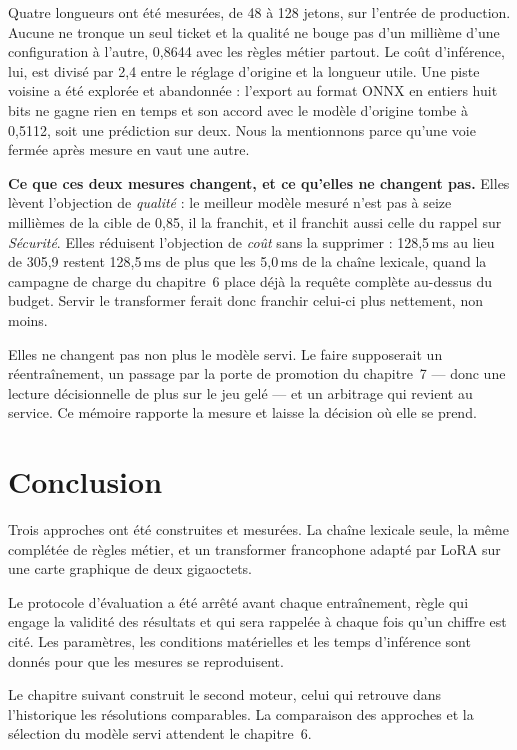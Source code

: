 Quatre longueurs ont été mesurées, de 48 à 128 jetons, sur l'entrée de production. Aucune ne
tronque un seul ticket et la qualité ne bouge pas d'un millième d'une configuration à l'autre,
0,8644 avec les règles métier partout. Le coût d'inférence, lui, est divisé par 2,4 entre le
réglage d'origine et la longueur utile. Une piste voisine a été explorée et abandonnée : l'export
au format ONNX en entiers huit bits ne gagne rien en temps et son accord avec le modèle d'origine
tombe à 0,5112, soit une prédiction sur deux. Nous la mentionnons parce qu'une voie fermée après
mesure en vaut une autre.

\textbf{Ce que ces deux mesures changent, et ce qu'elles ne changent pas.} Elles lèvent l'objection
de \emph{qualité} : le meilleur modèle mesuré n'est pas à seize millièmes de la cible de 0,85, il la
franchit, et il franchit aussi celle du rappel sur \emph{Sécurité}. Elles réduisent l'objection de
\emph{coût} sans la supprimer : 128,5\,ms au lieu de 305,9 restent 128,5\,ms de plus que les
5,0\,ms de la chaîne lexicale, quand la campagne de charge du chapitre~6 place déjà la requête
complète au-dessus du budget. Servir le transformer ferait donc franchir celui-ci plus nettement,
non moins.

Elles ne changent pas non plus le modèle servi. Le faire supposerait un réentraînement, un passage
par la porte de promotion du chapitre~7 — donc une lecture décisionnelle de plus sur le jeu gelé —
et un arbitrage qui revient au service. Ce mémoire rapporte la mesure et laisse la décision où elle
se prend.


\FloatBarrier

\section*{Conclusion}

Trois approches ont été construites et mesurées. La chaîne lexicale seule, la même complétée de
règles métier, et un transformer francophone adapté par LoRA sur une carte graphique de deux
gigaoctets.

Le protocole d'évaluation a été arrêté avant chaque entraînement, règle qui engage la validité des
résultats et qui sera rappelée à chaque fois qu'un chiffre est cité. Les paramètres, les conditions
matérielles et les temps d'inférence sont donnés pour que les mesures se reproduisent.

Le chapitre suivant construit le second moteur, celui qui retrouve dans l'historique les résolutions
comparables. La comparaison des approches et la sélection du modèle servi attendent le chapitre~6.
